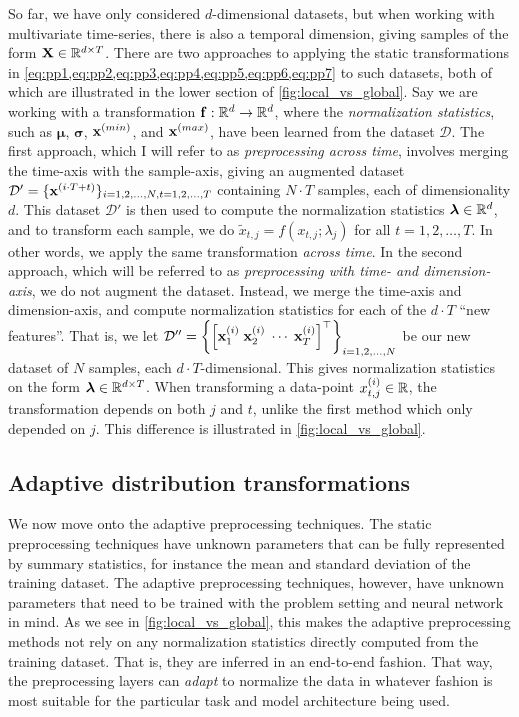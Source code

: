\documentclass{statsmsc}
\begin{document}
{So far, we have only considered $d$-dimensional datasets, but when working with multivariate
time-series, there is also a temporal dimension, giving samples of the form
$\mathbf{X} \in \mathbb{R}^{d\times T}$. There are two approaches to applying the static
transformations in \cref{eq:pp1,eq:pp2,eq:pp3,eq:pp4,eq:pp5,eq:pp6,eq:pp7}
to such datasets, both of which are illustrated in the lower section of \cref{fig:local_vs_global}.
Say we are working with a transformation $\mathbf{f}: \mathbb{R}^d \rightarrow {\mathbb{R}^d}$, where the \textit{normalization statistics}, such as $\bm\mu$, $\bm\sigma$, $\mathbf{x}^{(min)}$, and $\mathbf{x}^{(max)}$, have been learned
from the dataset $\mathcal{D}$. The first approach, which I will refer to as
\textit{preprocessing across time}, involves merging the time-axis with the sample-axis, giving
an augmented dataset $\mathcal{D}'=\{\mathbf{x}^{(i\cdot T +t)}\}_{i=1,2,\dots,N,t=1,2,\dots,T}$
containing $N \cdot T$ samples, each of dimensionality $d$. This dataset $\mathcal{D}'$ is then
used to compute the normalization statistics $\bm\lambda \in \mathbb{R}^d$, and to transform each sample, we do
$\tilde{x}_{t,j}=f(x_{t,j};\lambda_j)$ for all $t=1,2,\dots,T$. In other words, we apply the same
transformation \textit{across time}.
%
In the second approach, which will be referred to as
\textit{preprocessing with time- and dimension-axis}, we do not augment the dataset. Instead,
we merge the time-axis and dimension-axis, and compute normalization statistics for
each of the $d \cdot T$ ``new features''. That is, we let
$\mathcal{D}''=\left\{\left[\mathbf{x}^{(i)}_{1} \; \mathbf{x}^{(i)}_{2} \; \cdots \; \mathbf{x}^{(i)}_{T} \right]^\top \right\}_{i=1,2,\dots,N}$ be our new dataset of $N$ samples, each $d\cdot T$-dimensional.
This gives normalization statistics on the form $\bm\lambda \in \mathbb{R}^{d\times T}$.
When transforming a data-point $x^{(i)}_{t,j}\in\mathbb{R}$, the transformation depends on both $j$ and $t$,
unlike the first method which only depended on $j$. This difference is illustrated
in \cref{fig:local_vs_global}.



\subsection{Adaptive distribution transformations}%
\label{sub:Adaptive distribution transformations}

We now move onto the adaptive preprocessing techniques. The static
preprocessing techniques have unknown parameters that can be fully represented
by summary statistics, for instance the mean and standard deviation of the
training dataset. The adaptive preprocessing techniques, however, have unknown
parameters that need to be trained with the problem setting and neural network in
mind. As we see in \cref{fig:local_vs_global}, this makes the adaptive preprocessing methods
not rely on any normalization statistics directly computed from the training dataset.
That is, they are inferred in an end-to-end fashion. That way, the
preprocessing layers can \textit{adapt} to normalize the data in whatever
fashion is most suitable for the particular task and model architecture being used.


}
\end{document}
